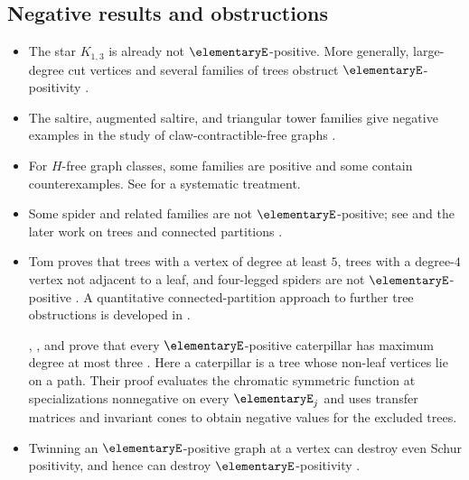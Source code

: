 \subsection[chromaticEExpansionNegative]{Negative results and obstructions}



\begin{itemize}
\item
The star $K_{1,3}$ is already not $\elementaryE$-positive.  More generally,
large-degree cut vertices and several families of trees obstruct
$\elementaryE$-positivity \cite{DahlbergSheWilligenburg2020}.

\item
The saltire, augmented saltire, and triangular tower families give negative
examples in the study of claw-contractible-free graphs
\cite{DahlbergFoleyWilligenburg2020}.

\item
For $H$-free graph classes, some families are positive and some contain
counterexamples.  See \cite{HamelHoangTuero2019,FoleyHoangMerkel2019} for a
systematic treatment.

\item
Some spider and related families are not $\elementaryE$-positive; see
\cite{FoleyKazdanKrollAlbergaMelnykTenenbaum2018x} and the later work on
trees and connected partitions \cite{Tom2026}.

\item
Tom proves that trees with a vertex of degree at least $5$, trees with a
degree-$4$ vertex not adjacent to a leaf, and four-legged spiders are not
$\elementaryE$-positive \cite{Tom2026}.  A quantitative connected-partition
approach to further tree obstructions is developed in \cite{EthanLi2025x}.

, , and
 prove that every $\elementaryE$-positive
caterpillar has maximum degree at most three
\cite[Thm.~3]{TangWangWang2026x}. Here a caterpillar is a tree whose
non-leaf vertices lie on a path. Their proof evaluates the chromatic
symmetric function at specializations nonnegative on every $\elementaryE_j$
and uses transfer matrices and invariant cones to obtain negative values
for the excluded trees.

\item
Twinning an $\elementaryE$-positive graph at a vertex can destroy even Schur
positivity, and hence can destroy $\elementaryE$-positivity
\cite{LiLiWangYang2021}.
\end{itemize}

